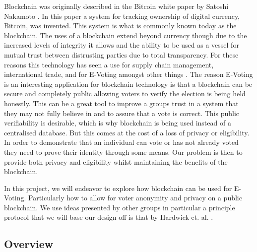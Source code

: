 \documentclass{entcs}
\begin{document}
Blockchain was originally described in the Bitcoin white paper by Satoshi Nakamoto \cite{BTCWhitepaper}. In this paper a system for tracking ownership of digital currency, Bitcoin, was invented. This system is what is commonly known today as the blockchain. The uses of a blockchain extend beyond currency though due to the increased levels of integrity it allows and the ability to be used as a vessel for mutual trust between distrusting parties due to total transparency. For these reasons this technology has seen a use for supply chain management, international trade, and for E-Voting amongst other things \cite{wust2018need}. The reason E-Voting is an interesting application for blockchain technology is that a blockchain can be secure and completely public allowing voters to verify the election is being held honestly. This can be a great tool to improve a groups trust in a system that they may not fully believe in and to assure that a vote is correct. This public verifiability is desirable, which is why blockchain is being used instead of a centralised database. But this comes at the cost of a loss of privacy or eligibility. In order to demonstrate that an individual can vote or has not already voted they need to prove their identity through some means. Our problem is then to provide both privacy and eligibility whilst maintaining the benefits of the blockchain.

In this project, we will endeavor to explore how blockchain can be used for E-Voting. Particularly how to allow for voter anonymity and privacy on a public blockchain. We use ideas presented by other groups in particular a principle protocol that we will base our design off is that by Hardwick et. al. \cite{hardwick2018}. 

\subsection{Overview}
\end{document}
